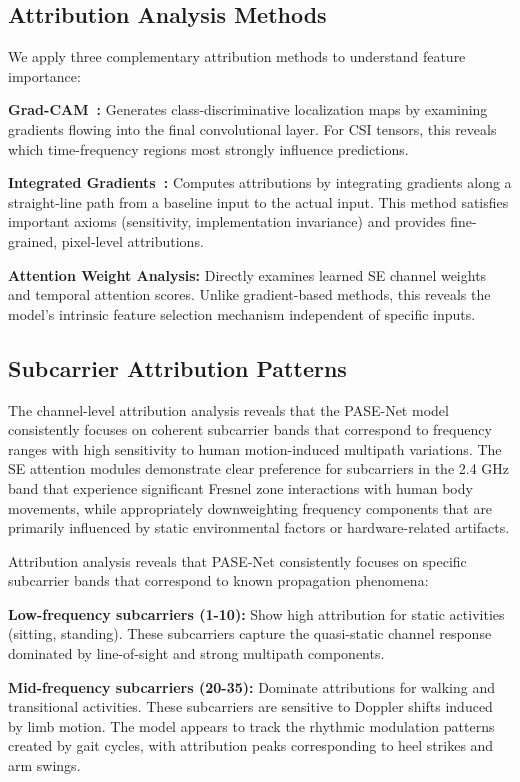 \documentclass[lettersize,journal]{IEEEtran}
\begin{document}
\subsection{Attribution Analysis Methods}

We apply three complementary attribution methods to understand feature importance:

\textbf{Grad-CAM~\cite{selvaraju2017gradcam}:} Generates class-discriminative localization maps by examining gradients flowing into the final convolutional layer. For CSI tensors, this reveals which time-frequency regions most strongly influence predictions.

\textbf{Integrated Gradients~\cite{sundararajan2017ig}:} Computes attributions by integrating gradients along a straight-line path from a baseline input to the actual input. This method satisfies important axioms (sensitivity, implementation invariance) and provides fine-grained, pixel-level attributions.

\textbf{Attention Weight Analysis:} Directly examines learned SE channel weights and temporal attention scores. Unlike gradient-based methods, this reveals the model's intrinsic feature selection mechanism independent of specific inputs.

\subsection{Subcarrier Attribution Patterns}

The channel-level attribution analysis reveals that the PASE-Net model consistently focuses on coherent subcarrier bands that correspond to frequency ranges with high sensitivity to human motion-induced multipath variations. The SE attention modules demonstrate clear preference for subcarriers in the 2.4 GHz band that experience significant Fresnel zone interactions with human body movements, while appropriately downweighting frequency components that are primarily influenced by static environmental factors or hardware-related artifacts.

Attribution analysis reveals that PASE-Net consistently focuses on specific subcarrier bands that correspond to known propagation phenomena:

\textbf{Low-frequency subcarriers (1-10):} Show high attribution for static activities (sitting, standing). These subcarriers capture the quasi-static channel response dominated by line-of-sight and strong multipath components.

\textbf{Mid-frequency subcarriers (20-35):} Dominate attributions for walking and transitional activities. These subcarriers are sensitive to Doppler shifts induced by limb motion. The model appears to track the rhythmic modulation patterns created by gait cycles, with attribution peaks corresponding to heel strikes and arm swings.
\end{document}
